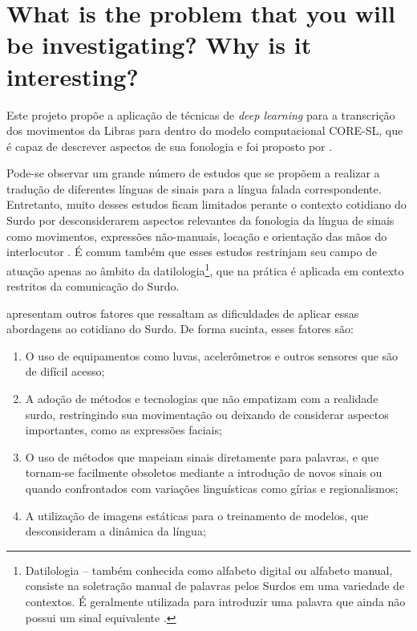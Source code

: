 

\maketitle

\section{What is the problem that you will be investigating? Why is it interesting?}

Este projeto propõe a aplicação de técnicas de \textit{deep learning} para a transcrição dos movimentos da Libras para dentro do modelo computacional CORE-SL, que é capaz de descrever aspectos de sua fonologia e foi proposto por \cite{antunes-2015}. 

Pode-se observar um grande número de estudos que se propõem a realizar a tradução de diferentes línguas de sinais para a língua falada correspondente. Entretanto, muito desses estudos ficam limitados perante o contexto cotidiano do Surdo por desconsiderarem aspectos relevantes da fonologia da língua de sinais como movimentos, expressões não-manuais, locação e orientação das mãos do interlocutor \cite{quadros-2004}. É comum também que esses estudos restrinjam seu campo de atuação apenas ao âmbito da datilologia\footnote{
Datilologia – também conhecida como alfabeto digital ou alfabeto manual, consiste na soletração manual de palavras pelos Surdos em uma variedade de contextos. É geralmente utilizada para introduzir uma palavra que ainda não possui um sinal equivalente \cite{quadros-2004}\cite{pereira-choi-2011}.
}, que na prática é aplicada em contexto restritos da comunicação do Surdo.

\textcite{antunes-hcisl-2011} apresentam outros fatores que ressaltam as dificuldades de aplicar essas abordagens ao cotidiano do Surdo. De forma sucinta, esses fatores são: 
\begin{enumerate}
\item O uso de equipamentos como luvas, acelerômetros e outros sensores que são de difícil acesso; 
\item A adoção de métodos e tecnologias que não empatizam com a realidade surdo, restringindo sua movimentação ou deixando de considerar aspectos importantes, como as expressões faciais;
\item O uso de métodos que mapeiam sinais diretamente para palavras, e que tornam-se facilmente obsoletos mediante a introdução de novos sinais ou quando confrontados com variações linguísticas como gírias e regionalismos; 
\item A utilização de imagens estáticas para o treinamento de modelos, que desconsideram a dinâmica da língua; 
\end{enumerate}


